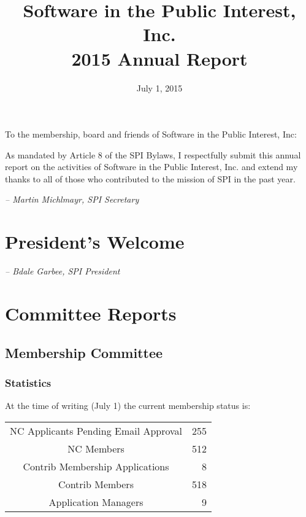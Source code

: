 \documentclass[letterpaper]{report}
\begin{document}
\title{Software in the Public Interest, Inc.\\
2015 Annual Report}
\date{July 1, 2015}

\maketitle

To the membership, board and friends of Software in the Public Interest, Inc:

As mandated by Article 8 of the SPI Bylaws, I respectfully submit this annual
report on the activities of Software in the Public Interest, Inc. and extend my
thanks to all of those who contributed to the mission of SPI in the past year.

  \emph{-- Martin Michlmayr, SPI Secretary}

\newpage

\tableofcontents

\newpage

\chapter{President's Welcome}
\label{sec:president}

  \emph{-- Bdale Garbee, SPI President}

\chapter{Committee Reports}
\section{Membership Committee}

\subsection{Statistics}

At the time of writing (July 1) the current membership status is:

\begin{tabular}{ | c | r | }
\hline
NC Applicants Pending Email Approval	& 255\\
NC Members				& 512\\
Contrib Membership Applications		& 8\\
Contrib Members				& 518\\
Application Managers			& 9\\
\hline
\end{tabular}
\end{document}
